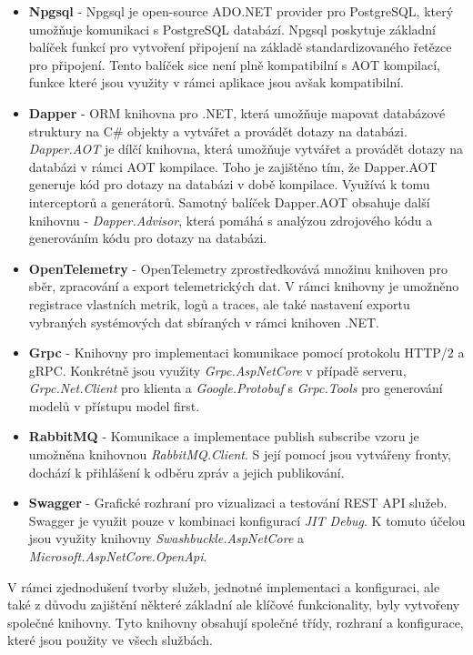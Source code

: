 \begin{itemize}
  \item \textbf{Npgsql} - Npgsql je open-source ADO.NET provider pro PostgreSQL, který umožňuje komunikaci s PostgreSQL databází. Npgsql poskytuje základní balíček funkcí pro vytvoření připojení na základě standardizovaného řetězce pro připojení. Tento balíček sice není plně kompatibilní s AOT kompilací, funkce které jsou využity v rámci aplikace jsou avšak kompatibilní.
  \item \textbf{Dapper} - ORM knihovna pro .NET, která umožňuje mapovat databázové struktury na C\# objekty a vytvářet a provádět dotazy na databázi. \emph{Dapper.AOT} je dílčí knihovna, která umožňuje vytvářet a provádět dotazy na databázi v rámci AOT kompilace. Toho je zajištěno tím, že Dapper.AOT generuje kód pro dotazy na databázi v době kompilace. Využívá k tomu interceptorů a generátorů. Samotný balíček Dapper.AOT obsahuje další knihovnu - \emph{Dapper.Advisor}, která pomáhá s analýzou zdrojového kódu a generováním kódu pro dotazy na databázi.
  \item \textbf{OpenTelemetry} - OpenTelemetry zprostředkovává množinu knihoven pro sběr, zpracování a export telemetrických dat. V rámci knihovny je umožněno registrace vlastních metrik, logů a traces, ale také nastavení exportu vybraných systémových dat sbíraných v rámci knihoven .NET.
  \item \textbf{Grpc} - Knihovny pro implementaci komunikace pomocí protokolu HTTP/2 a gRPC. Konkrétně jsou využity \emph{Grpc.AspNetCore} v případě serveru, \emph{Grpc.Net.Client} pro klienta a \emph{Google.Protobuf} s \emph{Grpc.Tools} pro generování modelů v přístupu model first.
  \item \textbf{RabbitMQ} - Komunikace a implementace publish subscribe vzoru je umožněna knihovnou \emph{RabbitMQ.Client}. S její pomocí jsou vytvářeny fronty, dochází k přihlášení k odběru zpráv a jejich publikování.
  \item \textbf{Swagger} - Grafické rozhraní pro vizualizaci a testování REST API služeb. Swagger je využit pouze v kombinaci konfigurací \emph{JIT Debug}. K tomuto účelou jsou využity knihovny \emph{Swashbuckle.AspNetCore} a \emph{Microsoft.AspNetCore.OpenApi}.
\end{itemize}


V rámci zjednodušení tvorby služeb, jednotné implementaci a konfiguraci, ale také z důvodu zajištění některé základní ale klíčové funkcionality, byly vytvořeny společné knihovny. Tyto knihovny obsahují společné třídy, rozhraní a konfigurace, které jsou použity ve všech službách.

